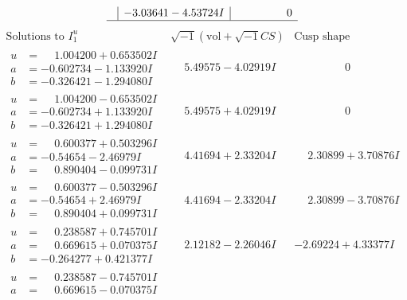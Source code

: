 \documentclass[1p]{elsarticle_modified}
\theoremstyle{definition}
\newcommand{\I}{\sqrt{-1}}
\begin{document}
$$\begin{array}{c|c|c}
 & -3.03641 - 4.53724 I & \phantom{-0.000000 } 0\\
 \hline 
 \end{array}$$\newpage$$\begin{array}{c|c|c}  
\text{Solutions to }I^u_{1}& \I (\text{vol} + \sqrt{-1}CS) & \text{Cusp shape}\\
 \hline 
\begin{aligned}
u &= \phantom{-}1.004200 + 0.653502 I \\
a &= -0.602734 - 1.133920 I \\
b &= -0.326421 - 1.294080 I\end{aligned}
 & \phantom{-}5.49575 - 4.02919 I & \phantom{-0.000000 } 0 \\ \hline\begin{aligned}
u &= \phantom{-}1.004200 - 0.653502 I \\
a &= -0.602734 + 1.133920 I \\
b &= -0.326421 + 1.294080 I\end{aligned}
 & \phantom{-}5.49575 + 4.02919 I & \phantom{-0.000000 } 0 \\ \hline\begin{aligned}
u &= \phantom{-}0.600377 + 0.503296 I \\
a &= -0.54654 - 2.46979 I \\
b &= \phantom{-}0.890404 - 0.099731 I\end{aligned}
 & \phantom{-}4.41694 + 2.33204 I & \phantom{-}2.30899 + 3.70876 I \\ \hline\begin{aligned}
u &= \phantom{-}0.600377 - 0.503296 I \\
a &= -0.54654 + 2.46979 I \\
b &= \phantom{-}0.890404 + 0.099731 I\end{aligned}
 & \phantom{-}4.41694 - 2.33204 I & \phantom{-}2.30899 - 3.70876 I \\ \hline\begin{aligned}
u &= \phantom{-}0.238587 + 0.745701 I \\
a &= \phantom{-}0.669615 + 0.070375 I \\
b &= -0.264277 + 0.421377 I\end{aligned}
 & \phantom{-}2.12182 - 2.26046 I & -2.69224 + 4.33377 I \\ \hline\begin{aligned}
u &= \phantom{-}0.238587 - 0.745701 I \\
a &= \phantom{-}0.669615 - 0.070375 I \\

\end{aligned}
\end{array}$$
\end{document}
